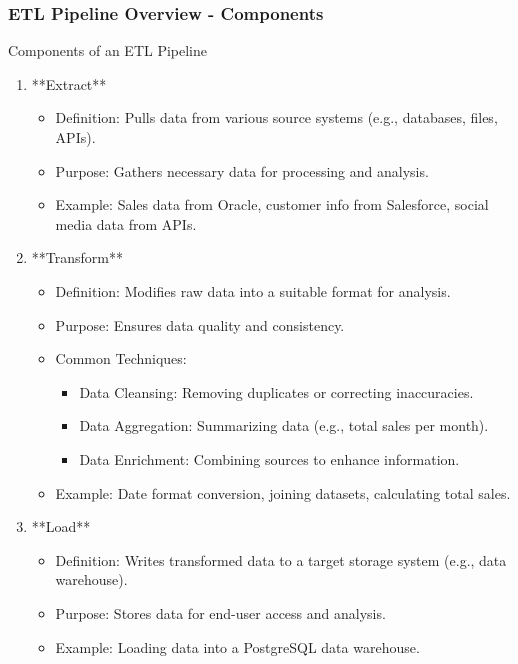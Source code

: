 \documentclass{beamer}
\begin{document}
\begin{frame}[fragile]
    \frametitle{ETL Pipeline Overview - Components}
    \begin{block}{Components of an ETL Pipeline}
        \begin{enumerate}
            \item **Extract**
                \begin{itemize}
                    \item Definition: Pulls data from various source systems (e.g., databases, files, APIs).
                    \item Purpose: Gathers necessary data for processing and analysis.
                    \item Example: Sales data from Oracle, customer info from Salesforce, social media data from APIs.
                \end{itemize}
            
            \item **Transform**
                \begin{itemize}
                    \item Definition: Modifies raw data into a suitable format for analysis.
                    \item Purpose: Ensures data quality and consistency.
                    \item Common Techniques:
                        \begin{itemize}
                            \item Data Cleansing: Removing duplicates or correcting inaccuracies.
                            \item Data Aggregation: Summarizing data (e.g., total sales per month).
                            \item Data Enrichment: Combining sources to enhance information.
                        \end{itemize}
                    \item Example: Date format conversion, joining datasets, calculating total sales.
                \end{itemize}
                
            \item **Load**
                \begin{itemize}
                    \item Definition: Writes transformed data to a target storage system (e.g., data warehouse).
                    \item Purpose: Stores data for end-user access and analysis.
                    \item Example: Loading data into a PostgreSQL data warehouse.
                \end{itemize}
        \end{enumerate}
    \end{block}
\end{frame}
\end{document}
